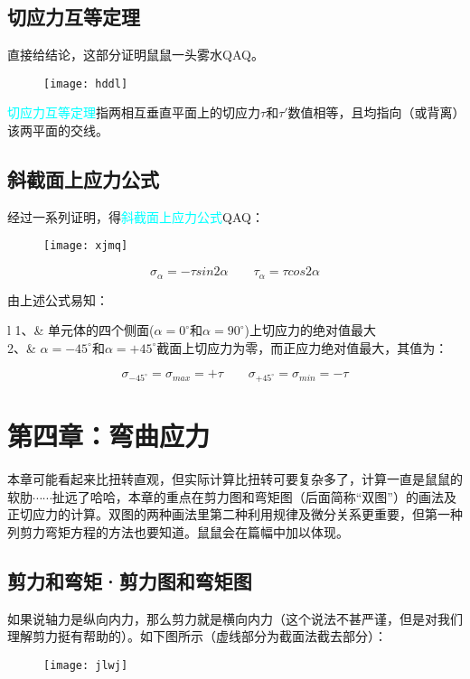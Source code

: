 \documentclass[10pt,a4paper]{ctexart}
\begin{document}
\subsection{切应力互等定理}
直接给结论，这部分证明鼠鼠一头雾水QAQ。
\begin{figure}[htp]%
	\centering
	\texttt{[image: hddl]}
\end{figure}

\textcolor{cyan}{切应力互等定理}指两相互垂直平面上的切应力$\tau$和$\tau'$数值相等，且均指向（或背离）该两平面的交线。

\subsection{斜截面上应力公式}
经过一系列证明，得\textcolor{cyan}{斜截面上应力公式}QAQ：
\begin{figure}[htp]%
	\centering
	\texttt{[image: xjmq]}
\end{figure}

\begin{equation}
	\sigma_{\alpha}=-\tau sin2\alpha \qquad \tau_{\alpha}=\tau cos2\alpha
\end{equation}

由上述公式易知：

\begin{tblr}{l}
	1、& 单元体的四个侧面($\alpha=0^{\circ}$和$\alpha=90^{\circ}$)上切应力的绝对值最大\\
	2、&
	$\alpha=-45^{\circ}$和$\alpha=+45^{\circ}$截面上切应力为零，而正应力绝对值最大，其值为：\\
\end{tblr}
\begin{equation}
	\sigma_{-45^{\circ}}=\sigma_{max}=+\tau \qquad
	\sigma_{+45^{\circ}}=\sigma_{min}=-\tau
\end{equation}

\newpage

\section{第四章：弯曲应力}
本章可能看起来比扭转直观，但实际计算比扭转可要复杂多了，计算一直是鼠鼠的软肋$\cdots \cdots$扯远了哈哈，本章的重点在剪力图和弯矩图（后面简称“双图”）的画法及正切应力的计算。双图的两种画法里第二种利用规律及微分关系更重要，但第一种列剪力弯矩方程的方法也要知道。鼠鼠会在篇幅中加以体现。

\subsection{剪力和弯矩·剪力图和弯矩图}
如果说轴力是纵向内力，那么剪力就是横向内力（这个说法不甚严谨，但是对我们理解剪力挺有帮助的）。如下图所示（虚线部分为截面法截去部分）：
\begin{figure}[htp]%
	\centering
	\texttt{[image: jlwj]}
\end{figure}
\end{document}

